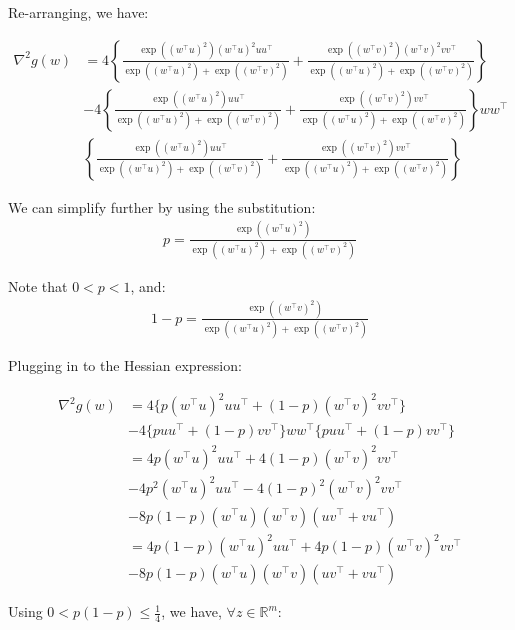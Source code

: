 \documentclass[11pt]{article}
\begin{document}
Re-arranging, we have:

\begin{align*}
    \nabla^2 g(w) &= 
    4 \left\{ \frac{  \exp((w^{\top}u)^2)(w^{\top}u)^2 uu^{\top}  }{ \exp((w^{\top}u)^2) + \exp((w^{\top}v)^2)  } +
    \frac{  \exp((w^{\top}v)^2)(w^{\top}v)^2 vv^{\top}  }{ \exp((w^{\top}u)^2) + \exp((w^{\top}v)^2)  } \right\} \\
    &- 4 \left\{
    \frac{  \exp((w^{\top}u)^2) uu^{\top}  }{ \exp((w^{\top}u)^2) + \exp((w^{\top}v)^2)  } + \frac{  \exp((w^{\top}v)^2) vv^{\top}  }{ \exp((w^{\top}u)^2) + \exp((w^{\top}v)^2)  } \right\}
    ww^{\top} \\
     & \left\{ \frac{  \exp((w^{\top}u)^2) uu^{\top}  }{ \exp((w^{\top}u)^2) + \exp((w^{\top}v)^2)  } + \frac{  \exp((w^{\top}v)^2) vv^{\top}  }{ \exp((w^{\top}u)^2) + \exp((w^{\top}v)^2)  }
     \right\}
\end{align*}

We can simplify further by using the substitution: 
\begin{align*}
p = \frac{\exp((w^{\top}u)^2)}{ \exp((w^{\top}u)^2) + \exp((w^{\top}v)^2) }
\end{align*}

Note that $0 < p < 1$, and:
\begin{align*}
1 - p = \frac{\exp((w^{\top}v)^2)}{ \exp((w^{\top}u)^2) + \exp((w^{\top}v)^2) }
\end{align*}

Plugging in to the Hessian expression:

\begin{align*}
    \nabla^2 g(w) &= 
    4 \{ p(w^{\top}u)^2 uu^{\top} + (1-p)(w^{\top}v)^2 vv^{\top} \} \\
    &- 4 \{ p uu^{\top} + (1-p) vv^{\top} \}ww^{\top}\{ p uu^{\top} + (1-p) vv^{\top} \} \\
    &= 4 p(w^{\top}u)^2 uu^{\top} + 4 (1-p)(w^{\top}v)^2 vv^{\top} \\
    &- 4 p^2 (w^{\top}u)^2 uu^{\top} - 4 (1-p)^2 (w^{\top}v)^2 vv^{\top} \\
    &- 8 p (1-p) (w^{\top}u)(w^{\top}v)(uv^{\top} + vu^{\top}) \\
    &= 4 p (1 - p) (w^{\top}u)^2 uu^{\top} + 4 p (1-p) (w^{\top}v)^2 vv^{\top} \\
    &- 8 p (1-p) (w^{\top}u)(w^{\top}v)(uv^{\top} + vu^{\top})
\end{align*}

Using $0 < p(1-p) \leq \frac{1}{4}$, we have, $\forall z \in \mathbb{R}^m$:
\end{document}
